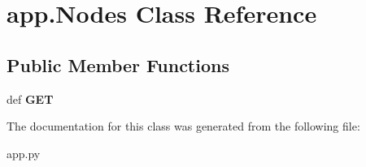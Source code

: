 \hypertarget{classapp_1_1_nodes}{\section{app.\+Nodes Class Reference}
\label{classapp_1_1_nodes}
}
\subsection*{Public Member Functions}
\begin{DoxyCompactItemize}
\item 
\hypertarget{classapp_1_1_nodes_aefc00a94ec1c7e987522b19bcee9d10f}{def {\bfseries G\+E\+T}}\label{classapp_1_1_nodes_aefc00a94ec1c7e987522b19bcee9d10f}

\end{DoxyCompactItemize}


The documentation for this class was generated from the following file\+:\begin{DoxyCompactItemize}
\item 
app.\+py\end{DoxyCompactItemize}
